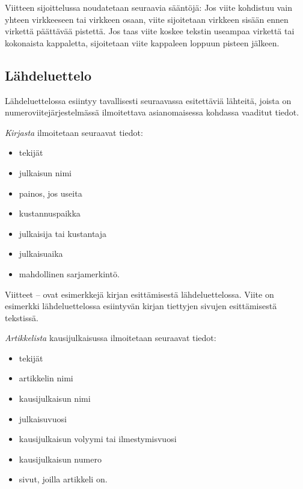 \documentclass[english,12pt,a4paper,pdftex,sci,utf8]{aaltothesis}
\begin{document}
Viitteen sijoittelussa noudatetaan seuraavia s\"a\"ant\"oj\"a:
Jos viite kohdistuu vain yhteen virkkeeseen tai virkkeen 
osaan, viite \cite{Kauranen} sijoitetaan virkkeen sis\"a\"an ennen virkett\"a
p\"a\"att\"av\"a\"a pistett\"a. Jos taas viite koskee tekstin useampaa
virkett\"a tai kokonaista kappaletta, sijoitetaan viite kappaleen loppuun 
pisteen j\"alkeen. \cite{Kauranen} 

\subsection*{L\"ahdeluettelo} 

L\"ahdeluettelossa esiintyy tavallisesti seuraavassa esitett\"avi\"a
l\"ahteit\"a, joista on numeroviitej\"arjestelm\"ass\"a ilmoitettava
asianomaisessa kohdassa vaaditut tiedot.

\textit{Kirjasta} ilmoitetaan seuraavat tiedot:

\begin{itemize}
\item[--]tekij\"at 
\item[--]julkaisun nimi
\item[--]painos, jos useita
\item[--]kustannuspaikka
\item[--]julkaisija tai kustantaja
\item[--]julkaisuaika
\item[--]mahdollinen sarjamerkint\"o. 
\end{itemize}

Viitteet \cite{Kauranen}--\cite{Koblitz} ovat esimerkkej\"a kirjan
esitt\"amisest\"a l\"ahdeluettelossa. Viite \cite[s.\ 83--124]{Koblitz} on
esimerkki l\"ahdeluettelossa esiintyv\"an kirjan tiettyjen sivujen
esitt\"amisest\"a tekstiss\"a.

\textit{Artikkelista} kausijulkaisussa ilmoitetaan seuraavat tiedot:

\begin{itemize}

\item[--]tekij\"at
\item[--]artikkelin nimi
\item[--]kausijulkaisun nimi
\item[--]julkaisuvuosi
\item[--]kausijulkaisun volyymi tai ilmestymisvuosi
\item[--]kausijulkaisun numero
\item[--]sivut, joilla artikkeli on.
\end{itemize}
\end{document}
